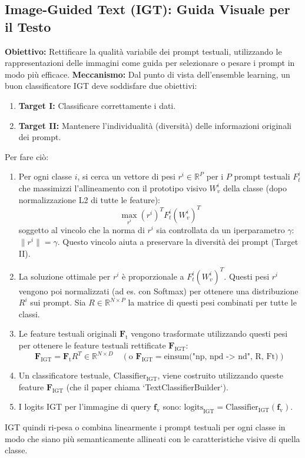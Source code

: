 \documentclass[11pt,a4paper]{article}
\newcommand{\Ft}{\mathbf{F}_\text{t}}      %
\newcommand{\fv}{\mathbf{f}_\text{v}}      %
\newcommand{\Figt}{\mathbf{F}_\text{IGT}}  %
\newcommand{\R}{\mathbb{R}}
\begin{document}
\subsection{Image-Guided Text (IGT): Guida Visuale per il Testo}
\textbf{Obiettivo:} Rettificare la qualità variabile dei prompt testuali, utilizzando le rappresentazioni delle immagini come guida per selezionare o pesare i prompt in modo più efficace.
\textbf{Meccanismo:}
Dal punto di vista dell'ensemble learning, un buon classificatore IGT deve soddisfare due obiettivi:
\begin{enumerate}
    \item \textbf{Target I:} Classificare correttamente i dati.
    \item \textbf{Target II:} Mantenere l'individualità (diversità) delle informazioni originali dei prompt.
\end{enumerate}
Per fare ciò:
\begin{enumerate}
    \item Per ogni classe $i$, si cerca un vettore di pesi $r^i \in \R^P$ per i $P$ prompt testuali $F_t^i$ che massimizzi l'allineamento con il prototipo visivo $W_v^i$ della classe (dopo normalizzazione L2 di tutte le feature):
    \[ \max_{r^i} (r^i)^T F_t^i (W_v^i)^T \]
    soggetto al vincolo che la norma di $r^i$ sia controllata da un iperparametro $\gamma$: $\|r^i\| = \gamma$. Questo vincolo aiuta a preservare la diversità dei prompt (Target II).
    \item La soluzione ottimale per $r^i$ è proporzionale a $F_t^i (W_v^i)^T$. Questi pesi $r^i$ vengono poi normalizzati (ad es. con Softmax) per ottenere una distribuzione $R^i$ sui prompt. Sia $R \in \R^{N \times P}$ la matrice di questi pesi combinati per tutte le classi.
    \item Le feature testuali originali $\Ft$ vengono trasformate utilizzando questi pesi per ottenere le feature testuali rettificate $\Figt$:
    \[ \Figt = \Ft R^T \in \R^{N \times D} \quad (\text{o } \Figt = \text{einsum("np, npd -> nd", R, Ft)}) \]
    \item Un classificatore testuale, $\text{Classifier}_{\text{IGT}}$, viene costruito utilizzando queste feature $\Figt$ (che il paper chiama `TextClassifierBuilder`).
    \item I logits IGT per l'immagine di query $\fv$ sono: $\text{logits}_{\text{IGT}} = \text{Classifier}_{\text{IGT}}(\fv)$.
\end{enumerate}
IGT quindi ri-pesa o combina linearmente i prompt testuali per ogni classe in modo che siano più semanticamente allineati con le caratteristiche visive di quella classe.
\end{document}
